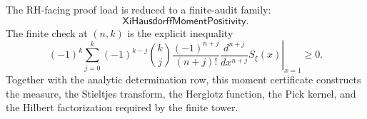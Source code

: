 \begin{principle}
\label{prin:rh-xi-hausdorff-audit-status}
The RH-facing proof load is reduced to a finite-audit family:
$$
\mathsf{XiHausdorffMomentPositivity}.
$$
The finite check at $(n,k)$ is the explicit inequality
$$
(-1)^k
\sum_{j=0}^{k}
(-1)^{k-j}
\binom{k}{j}
\frac{(-1)^{n+j}}{(n+j)!}
\left.
\frac{d^{n+j}}{dx^{n+j}}S_{\xi}(x)
\right|_{x=1}
\ge0.
$$
Together with the analytic determination row, this moment certificate
constructs the measure, the Stieltjes transform, the Herglotz function,
the Pick kernel, and the Hilbert factorization required by the finite
tower.
\end{principle}
